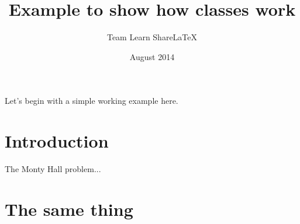 \documentclass[red]{unipac}
\title{Example to show how classes work}
\author{Team Learn ShareLaTeX}
\date{August 2014}
\begin{document}
 
\maketitle
 
\noindent
Let's begin with a simple working example here.
 
\blindtext
 
\section{Introduction}
 
The Monty Hall problem...
 
\section{The same thing}
\end{document}
